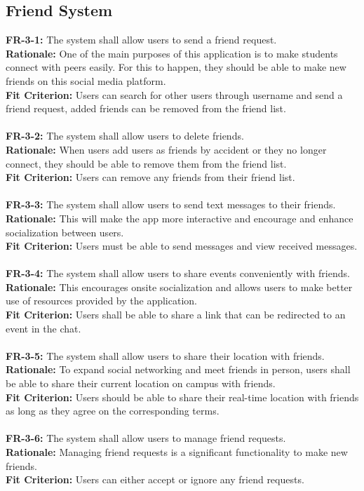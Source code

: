 \documentclass[12pt]{article}
\begin{document}
\subsection{Friend System}
    \textbf{FR-3-1:} The system shall allow users to send a friend request.\\
    \textbf{Rationale:} One of the main purposes of this application is to make students connect with peers easily. For this to happen, they should be able to make new friends on this social media platform.\\
    \textbf{Fit Criterion:} Users can search for other users through username and send a friend request, added friends can be removed from the friend list.\\\\
    \textbf{FR-3-2:} The system shall allow users to delete friends.\\
    \textbf{Rationale:} When users add users as friends by accident or they no longer connect, they should be able to remove them from the friend list.\\
    \textbf{Fit Criterion:} Users can remove any friends from their friend list.\\\\
    \textbf{FR-3-3:} The system shall allow users to send text messages to their friends.\\
    \textbf{Rationale:} This will make the app more interactive and encourage and enhance socialization between users.\\
    \textbf{Fit Criterion:} Users must be able to send messages and view received messages.\\\\
    \textbf{FR-3-4:} The system shall allow users to share events conveniently with friends.\\
    \textbf{Rationale:} This encourages onsite socialization and allows users to make better use of resources provided by the application.\\
    \textbf{Fit Criterion:} Users shall be able to share a link that can be redirected to an event in the chat.\\\\
    \textbf{FR-3-5:} The system shall allow users to share their location with friends.\\
    \textbf{Rationale:} To expand social networking and meet friends in person, users shall be able to share their current location on campus with friends.\\
    \textbf{Fit Criterion:} Users should be able to share their real-time location with friends as long as they agree on the corresponding terms.\\\\
    \textbf{FR-3-6:} The system shall allow users to manage friend requests.\\
    \textbf{Rationale:} Managing friend requests is a significant functionality to make new friends.\\
    \textbf{Fit Criterion:} Users can either accept or ignore any friend requests.\\\\
\end{document}
